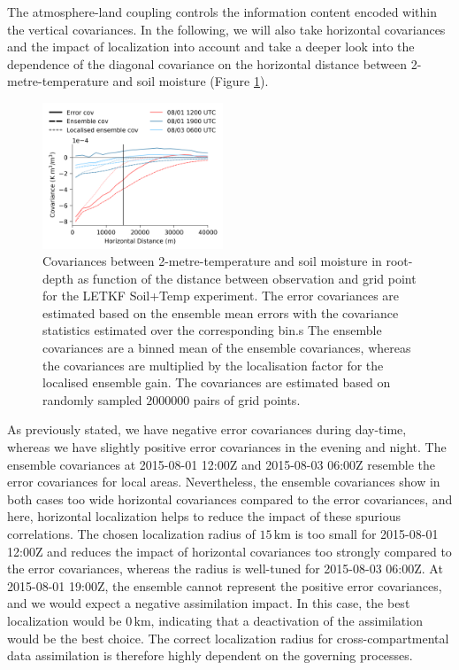 \documentclass[hess, manuscript]{copernicus}
\begin{document}
The atmosphere-land coupling controls the information content encoded within the vertical covariances.
In the following, we will also take horizontal covariances and the impact of localization into account and take a deeper look into the dependence of the diagonal covariance on the horizontal distance between 2-metre-temperature and soil moisture (Figure \ref{fig:covariance_dist}).

\begin{figure}[ht]
	\includegraphics[width=0.48\textwidth]{figures/fig_11_covariance_dist.png}
	\caption{
		Covariances between 2-metre-temperature and soil moisture in root-depth as function of the distance between observation and grid point for the LETKF Soil+Temp experiment.
		The error covariances are estimated based on the ensemble mean errors with the covariance statistics estimated over the corresponding bin.s
		The ensemble covariances are a binned mean of the ensemble covariances, whereas the covariances are multiplied by the localisation factor for the localised ensemble gain.
		The covariances are estimated based on randomly sampled $2000000$ pairs of grid points.
	}
	\label{fig:covariance_dist}
\end{figure}

As previously stated, we have negative error covariances during day-time, whereas we have slightly positive error covariances in the evening and night.
The ensemble covariances at 2015-08-01 12:00Z and 2015-08-03 06:00Z resemble the error covariances for local areas.
Nevertheless, the ensemble covariances show in both cases too wide horizontal covariances compared to the error covariances, and here, horizontal localization helps to reduce the impact of these spurious correlations.
The chosen localization radius of $15\,\text{km}$ is too small for 2015-08-01 12:00Z and reduces the impact of horizontal covariances too strongly compared to the error covariances, whereas the radius is well-tuned for 2015-08-03 06:00Z.
At 2015-08-01 19:00Z, the ensemble cannot represent the positive error covariances, and we would expect a negative assimilation impact.
In this case, the best localization would be $0\,\text{km}$, indicating that a deactivation of the assimilation would be the best choice.
The correct localization radius for cross-compartmental data assimilation is therefore highly dependent on the governing processes.
\end{document}
